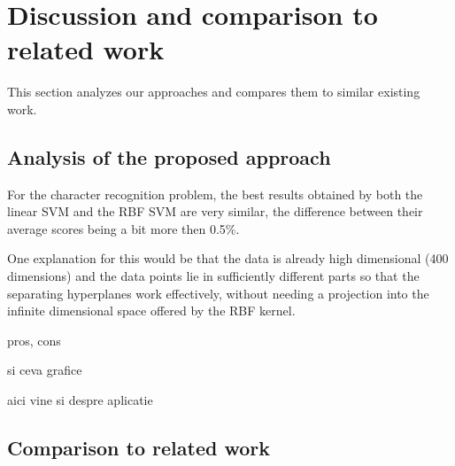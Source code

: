 \section{Discussion and comparison to related work}

This section analyzes our approaches and compares them to similar existing work.

\subsection{Analysis of the proposed approach}
For the character recognition problem, the best results obtained by both the linear SVM and the RBF SVM are very similar, the difference between their average scores being a bit more then 0.5\%. 

One explanation for this would be that the data is already high dimensional (400 dimensions) and the data points lie in sufficiently different parts so that the separating hyperplanes work effectively, without needing a projection into the infinite dimensional space offered by the RBF kernel. 

pros, cons

si ceva grafice 

aici vine si despre aplicatie
\subsection{Comparison to related work}

